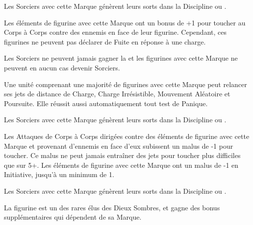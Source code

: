 Les Sorciers avec cette Marque génèrent leurs sorts dans la Discipline \alchemy{} ou \change{}.
\markclosesidetext{}\hfill{}

\spacebetweenmarks{}

\hfill\markstartsidetext{\markofwrath}
Les éléments de figurine avec cette Marque ont un bonus de +1 pour toucher au Corps à Corps contre des ennemis en face de leur figurine. Cependant, ces figurines ne peuvent pas déclarer de Fuite en réponse à une charge.

Les Sorciers ne peuvent jamais gagner la \markofwrath{} et les figurines avec cette Marque ne peuvent en aucun cas devenir Sorciers.
\markclosesidetext{}

\spacebetweenmarks{}

\markstartsidetext{\markoflust}
Une unité comprenant une majorité de figurines avec cette Marque peut relancer ses jets de distance de Charge, Charge Irrésistible, Mouvement Aléatoire et Poursuite. Elle réussit aussi automatiquement tout test de Panique.

Les Sorciers avec cette Marque génèrent leurs sorts dans la Discipline \lust{} ou \shadows{}.
\markclosesidetext{}\hfill{}

\spacebetweenmarks{}

\hfill\markstartsidetext{\markofpestilence}
Les Attaques de Corps à Corps dirigées contre des éléments de figurine avec cette Marque et provenant d'ennemis en face d'eux subissent un malus de -1 pour toucher. Ce malus ne peut jamais entraîner des jets pour toucher plus difficiles que sur 5+. Les éléments de figurine avec cette Marque ont un malus de -1 en Initiative, jusqu'à un minimum de 1.

Les Sorciers avec cette Marque génèrent leurs sorts dans la Discipline \disease{} ou \death{}.
\markclosesidetext{}

\spacebetweenmarks{}


\newpage
\armyspecialruleentry{\chosenofthegods}

La figurine est un des rares élus des Dieux Sombres, et gagne des bonus supplémentaires qui dépendent de sa Marque.

